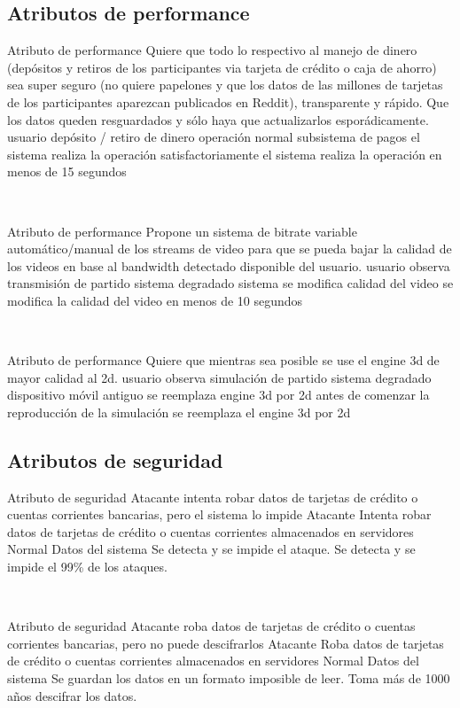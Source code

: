 \subsection{Atributos de performance}

\escenario
{Atributo de performance}
{Quiere que todo lo respectivo al manejo de dinero (depósitos y retiros de los participantes
via tarjeta de crédito o caja de ahorro) sea super seguro (no quiere papelones y que los
datos de las millones de tarjetas de los participantes aparezcan publicados en Reddit),
transparente y rápido. Que los datos queden resguardados y sólo haya que actualizarlos
esporádicamente.}
{usuario}
{depósito / retiro de dinero}
{operación normal}
{subsistema de pagos}
{el sistema realiza la operación satisfactoriamente}
{el sistema realiza la operación en menos de 15 segundos}

~

\escenario
{Atributo de performance}
{Propone un sistema de bitrate variable automático/manual de los streams de video para
que se pueda bajar la calidad de los videos en base al bandwidth detectado disponible del
usuario.}
{usuario}
{observa transmisión de partido}
{sistema degradado}
{sistema}
{se modifica calidad del video}
{se modifica la calidad del video en menos de 10 segundos}

~

\escenario
{Atributo de performance}
{Quiere que mientras sea posible se use el engine 3d de mayor calidad al 2d.}
{usuario}
{observa simulación de partido}
{sistema degradado}
{dispositivo móvil antiguo}
{se reemplaza engine 3d por 2d}
{antes de comenzar la reproducción de la simulación se reemplaza el engine 3d por 2d}


\subsection{Atributos de seguridad}

\escenario
{Atributo de seguridad}
{Atacante intenta robar datos de tarjetas de crédito o cuentas corrientes bancarias, pero el sistema lo impide}
{Atacante}
{Intenta robar datos de tarjetas de crédito o cuentas corrientes almacenados en servidores}
{Normal}
{Datos del sistema}
{Se detecta y se impide el ataque.}
{Se detecta y se impide el 99\% de los ataques.}

~

\escenario
{Atributo de seguridad}
{Atacante roba datos de tarjetas de crédito o cuentas corrientes bancarias, pero no puede descifrarlos}
{Atacante}
{Roba datos de tarjetas de crédito o cuentas corrientes almacenados en servidores}
{Normal}
{Datos del sistema}
{Se guardan los datos en un formato imposible de leer.}
{Toma más de 1000 años descifrar los datos.}

